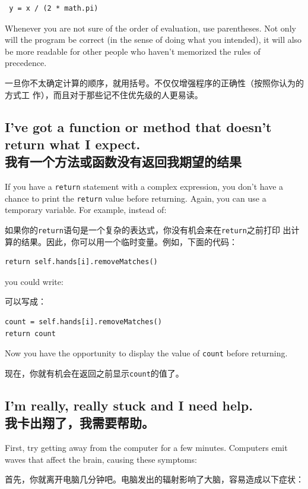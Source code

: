 \documentclass[10pt]{book}
\begin{document}
\begin{CJK}{UTF8}{gbsn}
\begin{verbatim}
 y = x / (2 * math.pi)
\end{verbatim}
%
Whenever you are not sure of the order of evaluation, use
parentheses.  Not only will the program be correct (in the sense
of doing what you intended), it will also be more readable for
other people who haven't memorized the rules of precedence.

一旦你不太确定计算的顺序，就用括号。不仅仅增强程序的正确性（按照你认为的方式工
作），而且对于那些记不住优先级的人更易读。


\subsection{I've got a function or method that doesn't return what I
expect.\\我有一个方法或函数没有返回我期望的结果}

If you have a {\tt return} statement with a complex expression,
you don't have a chance to print the {\tt return} value before
returning.  Again, you can use a temporary variable.  For
example, instead of:

如果你的{\tt return}语句是一个复杂的表达式，你没有机会来在{\tt return}之前打印
出计算的结果。因此，你可以用一个临时变量。例如，下面的代码：

\begin{verbatim}
return self.hands[i].removeMatches()
\end{verbatim}
%
you could write:

可以写成：

\begin{verbatim}
count = self.hands[i].removeMatches()
return count
\end{verbatim}
%
Now you have the opportunity to display the value of
{\tt count} before returning.

现在，你就有机会在返回之前显示{\tt count}的值了。


\subsection{I'm really, really stuck and I need help.\\我卡出翔了，我需要帮助。}

First, try getting away from the computer for a few minutes.
Computers emit waves that affect the brain, causing these
symptoms:

首先，你就离开电脑几分钟吧。电脑发出的辐射影响了大脑，容易造成以下症状：


\end{CJK}
\end{document}
